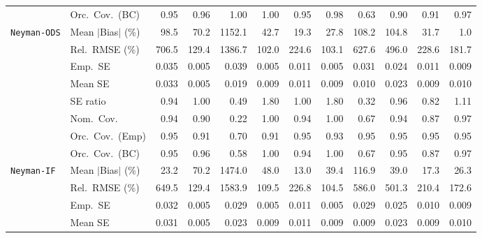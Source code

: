 \begin{landscape}
\begin{longtable}{llrrrrrrrrrr}
 & Orc.\ Cov.\ (BC) & \cellcolor{rankone}0.95 & \cellcolor{ranktwo}0.96 & 1.00 & 1.00 & \cellcolor{rankone}0.95 & 0.98 & 0.63 & 0.90 & 0.91 & \cellcolor{rankthree}0.97 \\
\addlinespace[2pt]
\quad \texttt{Neyman-ODS} & Mean $|$Bias$|$ (\%) & 98.5 & 70.2 & 1152.1 & 42.7 & \cellcolor{ranktwo}19.3 & \cellcolor{rankthree}27.8 & 108.2 & 104.8 & 31.7 & \cellcolor{rankone}1.0 \\
 & Rel.\ RMSE (\%) & 706.5 & \cellcolor{rankthree}129.4 & 1386.7 & \cellcolor{rankone}102.0 & 224.6 & \cellcolor{ranktwo}103.1 & 627.6 & 496.0 & 228.6 & 181.7 \\
 & Emp.\ SE & 0.035 & 0.005 & 0.039 & 0.005 & 0.011 & 0.005 & 0.031 & 0.024 & 0.011 & 0.009 \\
 & Mean SE & 0.033 & 0.005 & 0.019 & 0.009 & 0.011 & 0.009 & 0.010 & 0.023 & 0.009 & 0.010 \\
 & SE ratio & \cellcolor{rankthree}0.94 & \cellcolor{rankone}1.00 & 0.49 & 1.80 & \cellcolor{rankone}1.00 & 1.80 & 0.32 & \cellcolor{ranktwo}0.96 & 0.82 & 1.11 \\
 & Nom.\ Cov. & \cellcolor{rankone}0.94 & \cellcolor{rankthree}0.90 & 0.22 & \cellcolor{rankthree}1.00 & \cellcolor{rankone}0.94 & \cellcolor{rankthree}1.00 & 0.67 & \cellcolor{rankone}0.94 & 0.87 & \cellcolor{ranktwo}0.97 \\
 & Orc.\ Cov.\ (Emp) & \cellcolor{rankone}0.95 & \cellcolor{rankthree}0.91 & 0.70 & \cellcolor{rankthree}0.91 & \cellcolor{rankone}0.95 & \cellcolor{ranktwo}0.93 & \cellcolor{rankone}0.95 & \cellcolor{rankone}0.95 & \cellcolor{rankone}0.95 & \cellcolor{rankone}0.95 \\
 & Orc.\ Cov.\ (BC) & \cellcolor{rankone}0.95 & \cellcolor{ranktwo}0.96 & 0.58 & 1.00 & \cellcolor{ranktwo}0.94 & 1.00 & 0.67 & \cellcolor{rankone}0.95 & 0.87 & \cellcolor{rankthree}0.97 \\
\addlinespace[2pt]
\quad \texttt{Neyman-IF} & Mean $|$Bias$|$ (\%) & \cellcolor{rankthree}23.2 & 70.2 & 1474.0 & 48.0 & \cellcolor{rankone}13.0 & 39.4 & 116.9 & 39.0 & \cellcolor{ranktwo}17.3 & 26.3 \\
 & Rel.\ RMSE (\%) & 649.5 & \cellcolor{rankthree}129.4 & 1583.9 & \cellcolor{ranktwo}109.5 & 226.8 & \cellcolor{rankone}104.5 & 586.0 & 501.3 & 210.4 & 172.6 \\
 & Emp.\ SE & 0.032 & 0.005 & 0.029 & 0.005 & 0.011 & 0.005 & 0.029 & 0.025 & 0.010 & 0.009 \\
 & Mean SE & 0.031 & 0.005 & 0.023 & 0.009 & 0.011 & 0.009 & 0.009 & 0.023 & 0.009 & 0.010 \\

\end{longtable}
\end{landscape}
